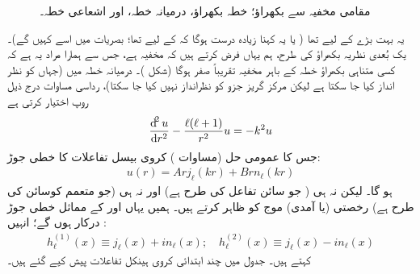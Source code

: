 \begin{figure}
\centering
{}
\caption{مقامی مخفیہ سے بکھراؤ؛ خطہ بکھراؤ، درمیانہ خطہ، اور اشعاعی خطہ۔}
\label{شکل_بکھراو_تین_خطے}
\end{figure}


یہ بہت بڑے  کے لیے تھا ( یا یہ کہنا زیادہ درست ہوگا کہ  کے لیے تھا؛ بصریات میں اسے  کہیں گے)۔ یک بُعدی نظریہ بکھراؤ کی طرح، ہم یہاں فرض کرتے ہیں کہ مخفیہ  ہے، جس سے ہمارا مراد یہ ہے کہ کسی متناہی بکھراؤ خطہ کے باہر مخفیہ تقریباً صفر ہوگا (شکل )۔ درمیانہ خطہ میں (جہاں  کو نظر انداز کیا جا سکتا ہے لیکن مرکز گریز جزو کو نظرانداز نہیں کیا جا سکتا)، رداسی مساوات درج ذیل روپ اختیار کرتی ہے
\begin{align}
	\frac{\dif^2u}{\dif r^2}-\frac{\ell(\ell+1)}{r^2}u = -k^2u
\end{align}
جس کا عمومی حل (مساوات ) کروی بیسل تفاعلات کا خطی جوڑ:
\begin{align}
	u(r) = Arj_{\ell}(kr)+Brn_{\ell}(kr)
\end{align}
ہو گا۔ لیکن نہ ہی  ( جو سائن تفاعل کی طرح ہے) اور نہ ہی  (جو متعمم کوسائن کی طرح ہے) رخصتی (یا آمدی) موج کو ظاہر کرتے ہیں۔ ہمیں یہاں  اور  کے مماثل خطی جوڑ درکار ہوں گے؛ انہیں :
\begin{align}\label{مساوات_بکھراو_کروی_ہینکل}
	h^{(1)}_{\ell}(x)\equiv j_{\ell}(x)+in_{\ell}(x);\quad h^{(2)}_{\ell}(x)\equiv j_{\ell}(x)-in_{\ell}(x)
\end{align}
 کہتے ہیں۔ جدول  میں چند ابتدائی کروی ہینکل تفاعلات پیش کیے گئے ہیں۔
